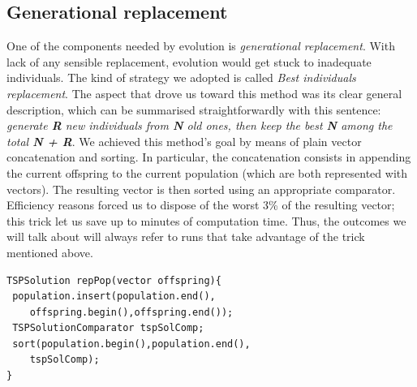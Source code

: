 \documentclass[letterpaper, 10 pt, conference]{ieeeconf}  %
\begin{document}
\subsection{Generational replacement}
One of the components needed by evolution is \textit{generational replacement}. With lack of any sensible replacement, evolution would get stuck to inadequate individuals. \newline 
The kind of strategy we adopted is called \textit{Best individuals replacement}. The aspect that drove us toward this method was its clear general description, which can be summarised straightforwardly with this sentence: \newline
\textit{generate \textbf{R} new individuals from \textbf{N} old ones, then keep the best \textbf{N} among the total \textbf{N + R}}. \newline
We achieved this method's goal by means of plain vector concatenation and sorting. In particular, the concatenation consists in appending the current offspring to the current population (which are both represented with vectors). The resulting vector is then sorted using an appropriate comparator. Efficiency reasons forced us to dispose of the worst 3\% of the resulting vector; this trick let us save up to minutes of computation time. Thus, the outcomes we will talk about will always refer to runs that take advantage of the trick mentioned above.
\begin{lstlisting}[caption={Best individual replacement, in \texttt{TSPPopulation.cpp}}]
TSPSolution repPop(vector offspring){ 
 population.insert(population.end(), 
    offspring.begin(),offspring.end());
 TSPSolutionComparator tspSolComp;
 sort(population.begin(),population.end(),
    tspSolComp);
}		
\end{lstlisting}
\end{document}

